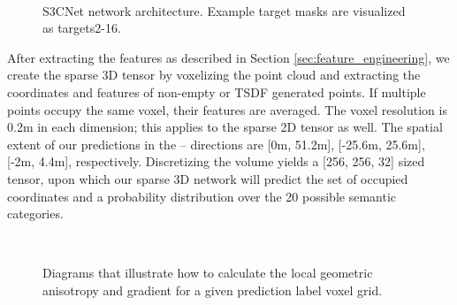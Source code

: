 \documentclass{article}
\begin{document}
\setlength{\columnsep}{5pt}\begin{wrapfigure}{l}{7cm}
  \centering
  \captionsetup{font=scriptsize,labelfont=scriptsize}
  \\
  \captionsetup{font=scriptsize,labelfont=scriptsize}
  \caption{S3CNet network architecture. Example target masks are visualized as targets2-16.}
  \label{fig:system_architecture}
  \vspace{-10px}
\end{wrapfigure}




After extracting the features as described in Section \ref{sec:feature_engineering}, we create the sparse 3D tensor by voxelizing the point cloud and extracting the coordinates and features of non-empty or TSDF generated points. If multiple points occupy the same voxel, their features are averaged. The voxel resolution is 0.2m in each dimension; this applies to the sparse 2D tensor as well. The spatial extent of our predictions in the -- directions are [0m, 51.2m], [-25.6m, 25.6m], [-2m, 4.4m], respectively. Discretizing the volume yields a [256, 256, 32] sized tensor, upon which our sparse 3D network will predict the set of occupied coordinates and a probability distribution over the 20 possible semantic categories.


\setlength{\columnsep}{5pt}\begin{wrapfigure}{r}{5cm}
  \centering
  \captionsetup{font=scriptsize,labelfont=scriptsize}
  \\
  \captionsetup{font=scriptsize,labelfont=scriptsize}
  \caption{Diagrams that illustrate how to calculate the local geometric anisotropy and gradient for a given prediction label voxel grid.}
  \label{fig: lga_vis}
  \vspace{-10px}
\end{wrapfigure}
\end{document}
